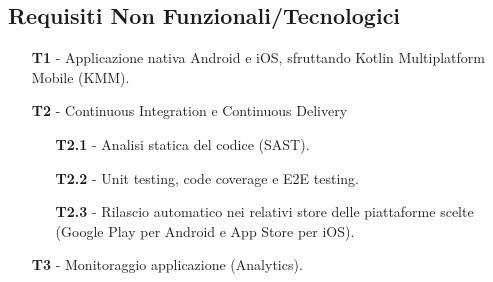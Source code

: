 \subsection{Requisiti Non Funzionali/Tecnologici}
\begin{itemize}
    \item[\textbf{T1}] - Applicazione nativa Android e iOS, sfruttando Kotlin Multiplatform Mobile (KMM).
    \item[\textbf{T2}] - Continuous Integration e Continuous Delivery
    \begin{itemize}
        \item[\textbf{T2.1}] - Analisi statica del codice (SAST).
        \item[\textbf{T2.2}] - Unit testing, code coverage e E2E testing.
        \item[\textbf{T2.3}] - Rilascio automatico nei relativi store delle piattaforme scelte (Google Play per Android e App Store per iOS).
    \end{itemize}
    \item[\textbf{T3}] - Monitoraggio applicazione (Analytics).
\end{itemize}
